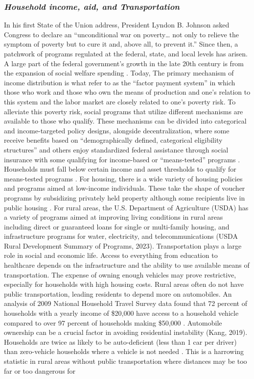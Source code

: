 \subsubsection{\textit{Household income, aid, and Transportation }}
In his first State of the Union address, President Lyndon B. Johnson asked Congress to declare an “unconditional war on poverty… not only to relieve the symptom of poverty but to cure it and, above all, to prevent it.” %
Since then, a patchwork of programs regulated at the federal, state, and local levels has arisen. A large part of the federal government's growth in the late 20th century is from the expansion of social welfare spending \citep{fishback_social_2020}. Today, The primary mechanism of income distribution is what \citet{berkowitz_gaps_2023} refer to as the “factor payment system” in which those who work and those who own the means of production and one’s relation to this system and the labor market are closely related to one’s poverty risk. To alleviate this poverty risk, social programs that utilize different mechanisms are available to those who qualify. These mechanisms can be divided into categorical and income-targeted policy designs, alongside decentralization, where some receive benefits based on “demographically defined, categorical eligibility structures” and others enjoy standardized federal assistance through social insurance with some qualifying for income-based or “means-tested” programs \citep{bruch_poverty_2023}. Households must fall below certain income and asset thresholds to qualify for means-tested programs \citep{rank_welfare_2002}. For housing, there is a wide variety of housing policies and programs aimed at low-income individuals. These take the shape of voucher programs by subsidizing privately held property although some recipients live in public housing \citep{kim_housing_2017}. For rural areas, the U.S. Department of Agriculture (USDA) has a variety of programs aimed at improving living conditions in rural areas including direct or guaranteed loans for single or multi-family housing, and infrastructure programs for water, electricity, and telecommunications (USDA Rural Development Summary of Programs, 2023). Transportation plays a large role in social and economic life. Access to everything from education to healthcare depends on the infrastructure and the ability to use available means of transportation. The expense of owning enough vehicles may prove restrictive, especially for households with high housing costs. Rural areas often do not have public transportation, leading residents to depend more on automobiles. An analysis of 2009 National Household Travel Survey data found that 72 percent of households with a yearly income of \$20,000 have access to a household vehicle compared to over 97 percent of households making \$50,000 \citep{blumenberg_automobile_2012}. Automobile ownership can be a crucial factor in avoiding residential instability (Kang, 2019). Households are twice as likely to be auto-deficient (less than 1 car per driver) than zero-vehicle households where a vehicle is not needed \citep{blumenberg_car-deficit_2020}. This is a harrowing statistic in rural areas without public transportation where distances may be too far or too dangerous for 